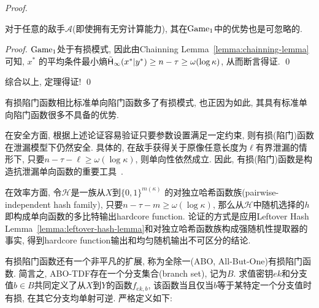 \begin{proof}
\begin{claim}
对于任意的敌手$\mathcal{A}$(即使拥有无穷计算能力), 其在$\textup{Game}_1$中的优势也是可忽略的. 
\end{claim}

\begin{proof}
$\textup{Game}_1$处于有损模式, 因此由Chainning Lemma~\ref{lemma:chainning-lemma}可知, $x^*$
的平均条件最小熵$\tilde{\mathsf{H}}_\infty(x^*|y^*) \geq n - \tau \geq \omega(\log \kappa)$, 从而断言得证. \qed
\end{proof}

综合以上, 定理得证! \qed
\end{proof}

\begin{remark}
有损陷门函数相比标准单向陷门函数多了有损模式, 也正因为如此, 其具有标准单向陷门函数很多不具备的优势. 

在安全方面, 根据上述论证容易验证只要参数设置满足一定约束, 则有损(陷门)函数在泄漏模型下仍然安全. 
具体的, 在敌手获得关于原像任意长度为$\ell$有界泄漏的情形下, 
只要$n - \tau - \ell \geq \omega(\log \kappa)$, 则单向性依然成立. 
因此, 有损(陷门)函数是构造抗泄漏单向函数的重要工具~\cite{Komargodski-TCC-2016, Chen-ASIACRYPT-2018}. 

在效率方面, 令$\mathcal{H}$是一族从$X$到$\{0,1\}^{m(\kappa)}$
的对独立哈希函数族(pairwise-independent hash family), 
只要$n - \tau - m \geq \omega(\log \kappa)$, 
那么从$\mathcal{H}$中随机选择的$h$即构成单向函数的多比特输出hardcore function. 
论证的方式是应用Leftover Hash Lemma~\ref{lemma:leftover-hash-lemma}和对独立哈希函数族构成强随机性提取器的事实, 
得到hardcore function输出和均匀随机输出不可区分的结论.   
\end{remark}

有损陷门函数还有一个非平凡的扩展, 称为全除一(ABO, All-But-One)有损陷门函数. 
简言之, ABO-TDF存在一个分支集合(branch set), 记为$B$. 求值密钥$ek$和分支值$b \in B$共同定义了从$X$到$Y$的函数$f_{ek, b}$, 
该函数当且仅当$b$等于某特定一个分支值时有损, 在其它分支均单射可逆. 严格定义如下:  

